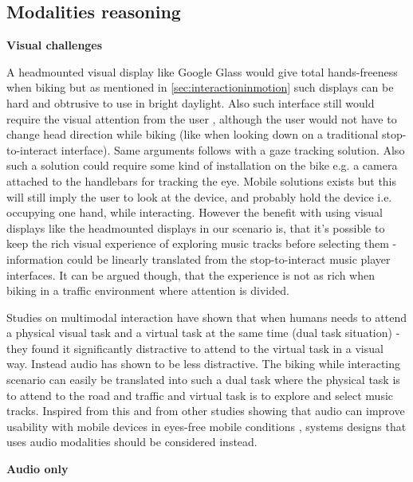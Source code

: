 \subsection{Modalities reasoning}

\textbf{Visual challenges}

A headmounted visual display like Google Glass would give total hands-freeness when biking but as mentioned in \ref{sec:interactioninmotion} such displays can be hard and obtrusive to use in bright daylight. Also such interface still would require the visual attention from the user \cite{geelhoed_safety_2000}, although the user would not have to change head direction while biking (like when looking down on a traditional stop-to-interact interface). Same arguments follows with a gaze tracking solution. Also such a solution could require some kind of installation on the bike e.g. a camera attached to the handlebars for tracking the eye. Mobile solutions exists \cite{mardanbegi_eye-based_2012} but this will still imply the user to look at the device, and probably hold the device i.e. occupying one hand, while interacting. However the benefit with using visual displays like the headmounted displays in our scenario is, that it's possible to keep the rich visual experience of exploring music tracks before selecting them - information could be linearly translated from the stop-to-interact music player interfaces. It can be argued though, that the experience is not as rich when biking in a traffic environment where attention is divided.

Studies on multimodal interaction \cite{zhao_shared_2013} have shown that when humans needs to attend a physical visual task and a virtual task at the same time (dual task situation) - they found it significantly distractive to attend to the virtual task in a visual way. Instead audio has shown to be less distractive. The biking while interacting scenario can easily be translated into such a dual task where the physical task is to attend to the road and traffic and virtual task is to explore and select music tracks. Inspired from this and from other studies showing that audio can improve usability with mobile devices in eyes-free mobile conditions \cite{brewster_multimodal_2003}, systems designs that uses audio modalities should be considered instead.

\textbf{Audio only}

